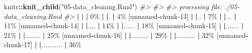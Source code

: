 \documentclass[
]{book}
\newenvironment{Shaded}{\begin{snugshade}}{\end{snugshade}}
\newcommand{\CommentTok}[1]{\textcolor[rgb]{0.56,0.35,0.01}{\textit{#1}}}
\newcommand{\DecValTok}[1]{\textcolor[rgb]{0.00,0.00,0.81}{#1}}
\newcommand{\ErrorTok}[1]{\textcolor[rgb]{0.64,0.00,0.00}{\textbf{#1}}}
\newcommand{\FunctionTok}[1]{\textcolor[rgb]{0.13,0.29,0.53}{\textbf{#1}}}
\newcommand{\NormalTok}[1]{#1}
\newcommand{\SpecialCharTok}[1]{\textcolor[rgb]{0.81,0.36,0.00}{\textbf{#1}}}
\newcommand{\StringTok}[1]{\textcolor[rgb]{0.31,0.60,0.02}{#1}}
\begin{document}
\begin{Shaded}
\begin{Highlighting}[]
\NormalTok{knitr}\SpecialCharTok{::}\FunctionTok{knit\_child}\NormalTok{(}\StringTok{"05{-}data\_cleaning.Rmd"}\NormalTok{)}
\CommentTok{\#\textgreater{} }
\CommentTok{\#\textgreater{} }
\CommentTok{\#\textgreater{} processing file: ./05{-}data\_cleaning.Rmd}
\CommentTok{\#\textgreater{} }
  \SpecialCharTok{|}                                     
  \ErrorTok{|}                               \ErrorTok{|}   \DecValTok{0}\NormalTok{\%}
  \SpecialCharTok{|}                                     
  \ErrorTok{|}\NormalTok{.                              }\SpecialCharTok{|}   \DecValTok{4}\NormalTok{\% [unnamed}\SpecialCharTok{{-}}\NormalTok{chunk}\DecValTok{{-}13}\NormalTok{]}
  \SpecialCharTok{|}                                     
  \ErrorTok{|}\NormalTok{..                             }\SpecialCharTok{|}   \DecValTok{7}\NormalTok{\%                   }
  \SpecialCharTok{|}                                     
  \ErrorTok{|}\NormalTok{...                            }\SpecialCharTok{|}  \DecValTok{11}\NormalTok{\% [unnamed}\SpecialCharTok{{-}}\NormalTok{chunk}\DecValTok{{-}14}\NormalTok{]}
  \SpecialCharTok{|}                                     
  \ErrorTok{|}\NormalTok{....                           }\SpecialCharTok{|}  \DecValTok{14}\NormalTok{\%                   }
  \SpecialCharTok{|}                                     
  \ErrorTok{|}\NormalTok{......                         }\SpecialCharTok{|}  \DecValTok{18}\NormalTok{\% [unnamed}\SpecialCharTok{{-}}\NormalTok{chunk}\DecValTok{{-}15}\NormalTok{]}
  \SpecialCharTok{|}                                     
  \ErrorTok{|}\NormalTok{.......                        }\SpecialCharTok{|}  \DecValTok{21}\NormalTok{\%                   }
  \SpecialCharTok{|}                                     
  \ErrorTok{|}\NormalTok{........                       }\SpecialCharTok{|}  \DecValTok{25}\NormalTok{\% [unnamed}\SpecialCharTok{{-}}\NormalTok{chunk}\DecValTok{{-}16}\NormalTok{]}
  \SpecialCharTok{|}                                     
  \ErrorTok{|}\NormalTok{.........                      }\SpecialCharTok{|}  \DecValTok{29}\NormalTok{\%                   }
  \SpecialCharTok{|}                                     
  \ErrorTok{|}\NormalTok{..........                     }\SpecialCharTok{|}  \DecValTok{32}\NormalTok{\% [unnamed}\SpecialCharTok{{-}}\NormalTok{chunk}\DecValTok{{-}17}\NormalTok{]}
  \SpecialCharTok{|}                                     
  \ErrorTok{|}\NormalTok{...........                    }\SpecialCharTok{|}  \DecValTok{36}\NormalTok{\%                   }

\end{Highlighting}
\end{Shaded}
\end{document}
